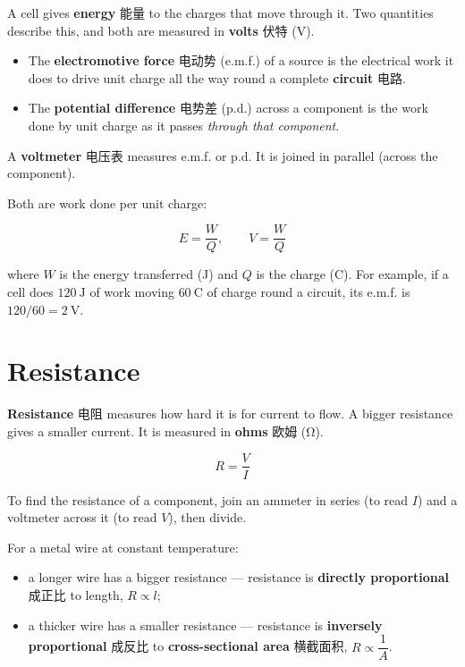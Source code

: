 \documentclass[11pt]{article}
\begin{document}
A cell gives \textbf{energy} 能量 to the charges that move through it. Two quantities describe this, and both are measured in \textbf{volts} 伏特 (V).

\begin{itemize}
\item The \textbf{electromotive force} 电动势 (e.m.f.) of a source is the electrical work it does to drive unit charge all the way round a complete \textbf{circuit} 电路.

\item The \textbf{potential difference} 电势差 (p.d.) across a component is the work done by unit charge as it passes \emph{through that component}.

\end{itemize}

A \textbf{voltmeter} 电压表 measures e.m.f. or p.d. It is joined in parallel (across the component).

Both are work done per unit charge:

\[
E = \frac{W}{Q}, \qquad V = \frac{W}{Q}
\]

where $W$ is the energy transferred (J) and $Q$ is the charge (C). For example, if a cell does $120\ \text{J}$ of work moving $60\ \text{C}$ of charge round a circuit, its e.m.f. is $120 / 60 = 2\ \text{V}$.

\section*{Resistance}

\textbf{Resistance} 电阻 measures how hard it is for current to flow. A bigger resistance gives a smaller current. It is measured in \textbf{ohms} 欧姆 (Ω).

\[
R = \frac{V}{I}
\]

To find the resistance of a component, join an ammeter in series (to read $I$) and a voltmeter across it (to read $V$), then divide.

For a metal wire at constant temperature:

\begin{itemize}
\item a longer wire has a bigger resistance — resistance is \textbf{directly proportional} 成正比 to length, $R \propto l$;

\item a thicker wire has a smaller resistance — resistance is \textbf{inversely proportional} 成反比 to \textbf{cross-sectional area} 横截面积, $R \propto \dfrac{1}{A}$.

\end{itemize}
\end{document}
